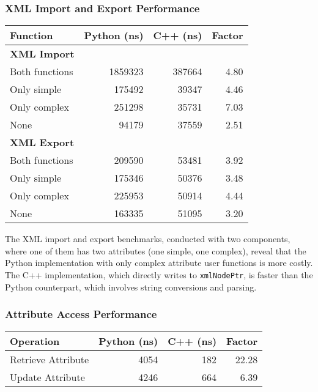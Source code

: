 \subsubsection{XML Import and Export Performance}

\begin{center}
\begin{tabular}{lrrr}
\textbf{Function} & \textbf{Python (ns)} & \textbf{C++ (ns)} & \textbf{Factor} \\
\hline
\textbf{XML Import} & & & \\
Both functions & 1859323 & 387664 & 4.80 \\
Only simple & 175492 & 39347 & 4.46 \\
Only complex & 251298 & 35731 & 7.03 \\
None & 94179 & 37559 & 2.51 \\
\textbf{XML Export} & & & \\
Both functions & 209590 & 53481 & 3.92 \\
Only simple & 175346 & 50376 & 3.48 \\
Only complex & 225953 & 50914 & 4.44 \\
None & 163335 & 51095 & 3.20 \\
\end{tabular}
\end{center}

The XML import and export benchmarks, conducted with two components, where one of them has two attributes (one simple, one complex), reveal that the Python implementation with only complex attribute user functions is more costly. The C++ implementation, which directly writes to \texttt{xmlNodePtr}, is faster than the Python counterpart, which involves string conversions and parsing.

\subsubsection{Attribute Access Performance}

\begin{center}
\begin{tabular}{lrrr}
\textbf{Operation} & \textbf{Python (ns)} & \textbf{C++ (ns)} & \textbf{Factor} \\
\hline
Retrieve Attribute & 4054 & 182 & 22.28 \\
Update Attribute & 4246 & 664 & 6.39 \\
\end{tabular}
\end{center}

